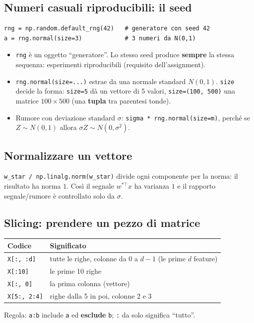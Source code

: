 \documentclass[11pt,a4paper]{article}
\begin{document}
\subsection{Numeri casuali riproducibili: il seed}
\begin{lstlisting}
rng = np.random.default_rng(42)   # generatore con seed 42
a = rng.normal(size=3)            # 3 numeri da N(0,1)
\end{lstlisting}
\begin{itemize}
  \item \texttt{rng} è un oggetto ``generatore''. Lo stesso seed produce \textbf{sempre} la stessa sequenza: esperimenti riproducibili
        (requisito dell'assignment).
  \item \texttt{rng.normal(size=...)} estrae da una normale standard $N(0,1)$. \texttt{size} decide la forma:
        \texttt{size=5} dà un vettore di 5 valori, \texttt{size=(100, 500)} una matrice $100\times 500$ (una \textbf{tupla} tra parentesi tonde).
  \item Rumore con deviazione standard $\sigma$: \texttt{sigma * rng.normal(size=m)}, perché se $Z\sim N(0,1)$ allora $\sigma Z \sim N(0,\sigma^2)$.
\end{itemize}

\subsection{Normalizzare un vettore}
\texttt{w\_star / np.linalg.norm(w\_star)} divide ogni componente per la norma: il risultato ha norma $1$.
Così il segnale $w^{*\top}x$ ha varianza $1$ e il rapporto segnale/rumore è controllato solo da $\sigma$.

\subsection{Slicing: prendere un pezzo di matrice}
\begin{center}
\begin{tabular}{@{}ll@{}}
\toprule
Codice & Significato \\
\midrule
\texttt{X[:, :d]} & tutte le righe, colonne da $0$ a $d-1$ (le prime $d$ feature) \\
\texttt{X[:10]} & le prime 10 righe \\
\texttt{X[:, 0]} & la prima colonna (vettore) \\
\texttt{X[5:, 2:4]} & righe dalla 5 in poi, colonne 2 e 3 \\
\bottomrule
\end{tabular}
\end{center}
Regola: \texttt{a:b} include \texttt{a} ed \textbf{esclude} \texttt{b}; \texttt{:} da solo significa ``tutto''.
\end{document}
